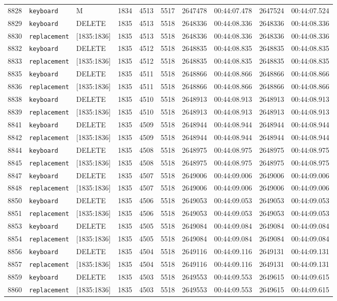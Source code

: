 \begin{paper}
\begin{table}[H]
\begin{tabular}{p{}p{}|p{}|p{}p{}p{}p{}p{}p{}p{}}
8828 & \verb|keyboard| & M & 1834 & 4513 & 5517 & 2647478 & 00:44:07.478 & 2647524 & 00:44:07.524\tabularnewline
8829 & \verb|keyboard| & DELETE & 1835 & 4513 & 5518 & 2648336 & 00:44:08.336 & 2648336 & 00:44:08.336\tabularnewline
8830 & \verb|replacement| & [1835:1836] & 1835 & 4513 & 5518 & 2648336 & 00:44:08.336 & 2648336 & 00:44:08.336\tabularnewline
8832 & \verb|keyboard| & DELETE & 1835 & 4512 & 5518 & 2648835 & 00:44:08.835 & 2648835 & 00:44:08.835\tabularnewline
8833 & \verb|replacement| & [1835:1836] & 1835 & 4512 & 5518 & 2648835 & 00:44:08.835 & 2648835 & 00:44:08.835\tabularnewline
8835 & \verb|keyboard| & DELETE & 1835 & 4511 & 5518 & 2648866 & 00:44:08.866 & 2648866 & 00:44:08.866\tabularnewline
8836 & \verb|replacement| & [1835:1836] & 1835 & 4511 & 5518 & 2648866 & 00:44:08.866 & 2648866 & 00:44:08.866\tabularnewline
8838 & \verb|keyboard| & DELETE & 1835 & 4510 & 5518 & 2648913 & 00:44:08.913 & 2648913 & 00:44:08.913\tabularnewline
8839 & \verb|replacement| & [1835:1836] & 1835 & 4510 & 5518 & 2648913 & 00:44:08.913 & 2648913 & 00:44:08.913\tabularnewline
8841 & \verb|keyboard| & DELETE & 1835 & 4509 & 5518 & 2648944 & 00:44:08.944 & 2648944 & 00:44:08.944\tabularnewline
8842 & \verb|replacement| & [1835:1836] & 1835 & 4509 & 5518 & 2648944 & 00:44:08.944 & 2648944 & 00:44:08.944\tabularnewline
8844 & \verb|keyboard| & DELETE & 1835 & 4508 & 5518 & 2648975 & 00:44:08.975 & 2648975 & 00:44:08.975\tabularnewline
8845 & \verb|replacement| & [1835:1836] & 1835 & 4508 & 5518 & 2648975 & 00:44:08.975 & 2648975 & 00:44:08.975\tabularnewline
8847 & \verb|keyboard| & DELETE & 1835 & 4507 & 5518 & 2649006 & 00:44:09.006 & 2649006 & 00:44:09.006\tabularnewline
8848 & \verb|replacement| & [1835:1836] & 1835 & 4507 & 5518 & 2649006 & 00:44:09.006 & 2649006 & 00:44:09.006\tabularnewline
8850 & \verb|keyboard| & DELETE & 1835 & 4506 & 5518 & 2649053 & 00:44:09.053 & 2649053 & 00:44:09.053\tabularnewline
8851 & \verb|replacement| & [1835:1836] & 1835 & 4506 & 5518 & 2649053 & 00:44:09.053 & 2649053 & 00:44:09.053\tabularnewline
8853 & \verb|keyboard| & DELETE & 1835 & 4505 & 5518 & 2649084 & 00:44:09.084 & 2649084 & 00:44:09.084\tabularnewline
8854 & \verb|replacement| & [1835:1836] & 1835 & 4505 & 5518 & 2649084 & 00:44:09.084 & 2649084 & 00:44:09.084\tabularnewline
8856 & \verb|keyboard| & DELETE & 1835 & 4504 & 5518 & 2649116 & 00:44:09.116 & 2649131 & 00:44:09.131\tabularnewline
8857 & \verb|replacement| & [1835:1836] & 1835 & 4504 & 5518 & 2649116 & 00:44:09.116 & 2649131 & 00:44:09.131\tabularnewline
8859 & \verb|keyboard| & DELETE & 1835 & 4503 & 5518 & 2649553 & 00:44:09.553 & 2649615 & 00:44:09.615\tabularnewline
8860 & \verb|replacement| & [1835:1836] & 1835 & 4503 & 5518 & 2649553 & 00:44:09.553 & 2649615 & 00:44:09.615\tabularnewline
\bottomrule
\end{tabular}
\end{table}
\renewcommand*{\thefootnote}{\arabic{footnote}} 


\end{paper}
